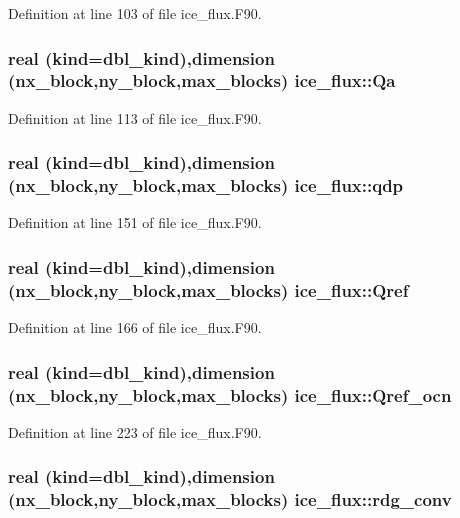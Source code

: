 Definition at line 103 of file ice\_\-flux.F90.\hypertarget{namespaceice__flux_af6a4cdca38aa449d2c23bd0faaead20a}{
\subsubsection[{Qa}]{\setlength{\rightskip}{0pt plus 5cm}real (kind=dbl\_\-kind),dimension (nx\_\-block,ny\_\-block,max\_\-blocks) {\bf ice\_\-flux::Qa}}}
\label{namespaceice__flux_af6a4cdca38aa449d2c23bd0faaead20a}


Definition at line 113 of file ice\_\-flux.F90.\hypertarget{namespaceice__flux_a178c03fc7b766259d4b973b4d055aa1d}{
\subsubsection[{qdp}]{\setlength{\rightskip}{0pt plus 5cm}real (kind=dbl\_\-kind),dimension (nx\_\-block,ny\_\-block,max\_\-blocks) {\bf ice\_\-flux::qdp}}}
\label{namespaceice__flux_a178c03fc7b766259d4b973b4d055aa1d}


Definition at line 151 of file ice\_\-flux.F90.\hypertarget{namespaceice__flux_ac332e72481b7da42322f9e2581f09434}{
\subsubsection[{Qref}]{\setlength{\rightskip}{0pt plus 5cm}real (kind=dbl\_\-kind),dimension (nx\_\-block,ny\_\-block,max\_\-blocks) {\bf ice\_\-flux::Qref}}}
\label{namespaceice__flux_ac332e72481b7da42322f9e2581f09434}


Definition at line 166 of file ice\_\-flux.F90.\hypertarget{namespaceice__flux_afece1d3107dcbd97234912ff91e89d8b}{
\subsubsection[{Qref\_\-ocn}]{\setlength{\rightskip}{0pt plus 5cm}real (kind=dbl\_\-kind),dimension (nx\_\-block,ny\_\-block,max\_\-blocks) {\bf ice\_\-flux::Qref\_\-ocn}}}
\label{namespaceice__flux_afece1d3107dcbd97234912ff91e89d8b}


Definition at line 223 of file ice\_\-flux.F90.\hypertarget{namespaceice__flux_aff0f1042e74134275ef6e30a2719c03f}{
\subsubsection[{rdg\_\-conv}]{\setlength{\rightskip}{0pt plus 5cm}real (kind=dbl\_\-kind),dimension (nx\_\-block,ny\_\-block,max\_\-blocks) {\bf ice\_\-flux::rdg\_\-conv}}}
\label{namespaceice__flux_aff0f1042e74134275ef6e30a2719c03f}


